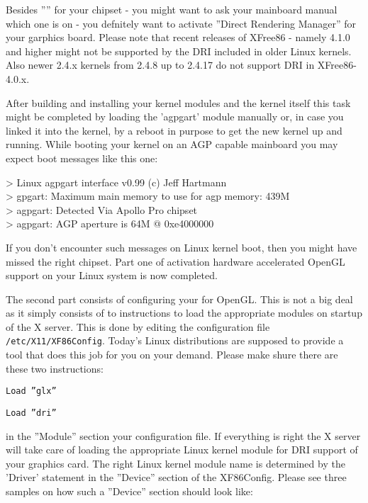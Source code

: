 Besides '''' for your chipset - you might want to ask your
mainboard manual which one is on - you defnitely want to activate ''Direct
Rendering Manager'' for your garphics board. Please note that recent releases
of XFree86 - namely 4.1.0 and higher might not be supported by the DRI
included in older Linux kernels. Also newer 2.4.x kernels from 2.4.8 up to
2.4.17 do not support DRI in XFree86-4.0.x.

After building and installing your kernel modules and the kernel itself this
task might be completed by loading the 'agpgart' module manually or, in case
you linked it into the kernel, by a reboot in purpose to get the new kernel
up and running. While booting your kernel on an AGP capable mainboard you
may expect boot messages like this one:
\medskip

\begin{ttfamily}
\noindent
> Linux agpgart interface v0.99 (c) Jeff Hartmann\\
> gpgart: Maximum main memory to use for agp memory: 439M\\
> agpgart: Detected Via Apollo Pro chipset\\
> agpgart: AGP aperture is 64M @ 0xe4000000
\end{ttfamily}
\medskip

If you don't encounter such messages on Linux kernel boot, then you might
have missed the right chipset. Part one of activation hardware accelerated OpenGL support on your Linux system is now completed.

The second part consists of configuring your  for OpenGL. This is
not a big deal as it simply consists of to instructions to load the
appropriate modules on startup of the X server.
This is done by editing the configuration file \texttt{/etc/X11/XF86Config}. Today's
Linux distributions are supposed to provide a tool that does this job for
you on your demand. Please make shure there are these two instructions:
\medskip


 \texttt{Load ''glx''}
 
 \texttt{Load ''dri''}
\medskip

\noindent
in the ''Module'' section your  configuration file. If everything is
right the X server will take care of loading the appropriate Linux kernel
module for DRI support of your graphics card. The right Linux kernel module
name is determined by the 'Driver' statement in the ''Device'' section of the
XF86Config. Please see three samples on how such a ''Device'' section should
look like:
\medskip

